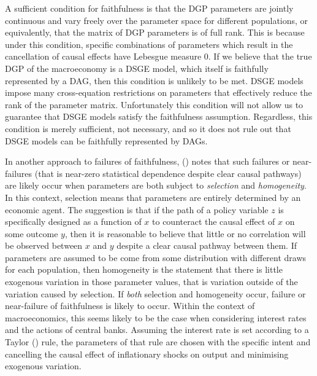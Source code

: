 \documentclass{article}
\begin{document}
A sufficient condition for faithfulness is that the DGP parameters are jointly continuous and vary freely over the parameter space \parencite{steel2006homogeneity} for different populations, or equivalently, that the matrix of DGP parameters is of full rank. This is because under this condition, specific combinations of parameters which result in the cancellation of causal effects have Lebesgue measure 0. If we believe that the true DGP of the macroeconomy is a DSGE model, which itself is faithfully represented by a DAG, then this condition is unlikely to be met. DSGE models impose many cross-equation restrictions on parameters that effectively reduce the rank of the parameter matrix. Unfortunately this condition will not allow us to guarantee that DSGE models satisfy the faithfulness assumption. Regardless, this condition is merely sufficient, not necessary, and so it does not rule out that DSGE models can be faithfully represented by DAGs. 

In another approach to failures of faithfulness, \citeauthor{steel2006homogeneity} (\citeyear{steel2006homogeneity}) notes that such failures or near-failures (that is near-zero statistical dependence despite clear causal pathways) are likely occur when parameters are both subject to \textit{selection} and \textit{homogeneity}. In this context, selection means that parameters are entirely determined by an economic agent. The suggestion is that if the path of a policy variable $z$ is specifically designed as a function of $x$ to counteract the causal effect of $x$ on some outcome $y$, then it is reasonable to believe that little or no correlation will be observed between $x$ and $y$ despite a clear causal pathway between them. If parameters are assumed to be come from some distribution with different draws for each population, then homogeneity is the statement that there is little exogenous variation in those parameter values, that is variation outside of the variation caused by selection. If \textit{both} selection and homogeneity occur, failure or near-failure of faithfulness is likely to occur. Within the context of macroeconomics, this seems likely to be the case when considering interest rates and the actions of central banks. Assuming the interest rate is set according to a Taylor (\citeyear{taylor1993discretion}) rule, the parameters of that rule are chosen with the specific intent and cancelling the causal effect of inflationary shocks on output and minimising exogenous variation. 
\end{document}
